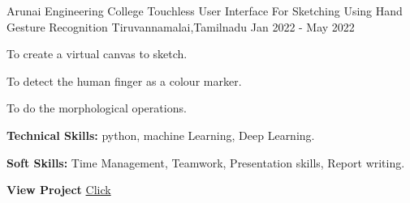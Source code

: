 

\begin{cventries}

  \cventry
    {Arunai Engineering College} %
    {Touchless User Interface For Sketching Using Hand Gesture Recognition} %
    {Tiruvannamalai,Tamilnadu} %
    {Jan 2022 - May 2022} %
    {
      \begin{cvitems} %
        \item {To create a virtual canvas to sketch.}
        \item {To detect the human finger as a colour marker.}
        \item {To do the morphological operations.}
        \item {\textbf{Technical Skills:} python, machine Learning, Deep Learning.}
        \item {\textbf{Soft Skills:} Time Management, Teamwork, Presentation skills, Report writing.}
         \item {\textbf{View Project} \href{https://medium.com/@ajitharunai/touchless-user-interface-for-sketching-using-hand-gesture-recognition-a11e463c1ce5} {Click} }
      \end{cvitems}
      }




\end{cventries}
